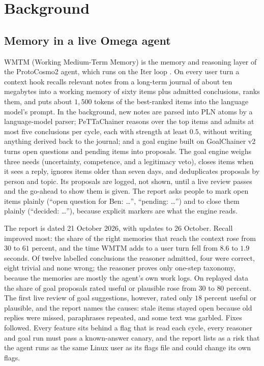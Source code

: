 \documentclass[11pt]{article}
\theoremstyle{definition}
\theoremstyle{plain}
\begin{document}
\section{Background}\label{sec:background}

\subsection{Memory in a live Omega agent}\label{sec:wmtm}

WMTM (Working Medium-Term Memory) is the memory and reasoning layer of the ProtoCosmo2 agent, which runs on the Iter loop \cite{wmtm}. On every user turn a context hook recalls relevant
notes from a long-term journal of about ten megabytes into a working memory of sixty items plus
admitted conclusions, ranks them, and puts about $1{,}500$ tokens of the best-ranked items into the
language model's prompt. In the background, new notes are parsed into PLN atoms by a language-model
parser; PeTTaChainer reasons over the top items and admits at most five conclusions per cycle, each
with strength at least $0.5$, without writing anything derived back to the journal; and a goal
engine built on GoalChainer v2 turns open questions and pending items into proposals. The goal
engine weighs three needs (uncertainty, competence, and a legitimacy veto), closes items when it
sees a reply, ignores items older than seven days, and deduplicates proposals by person and topic.
Its proposals are logged, not shown, until a live review passes and the go-ahead to show them is
given. The report asks people to mark open items plainly (``open question for Ben: \ldots'',
``pending: \ldots'') and to close them plainly (``decided: \ldots''), because explicit markers are
what the engine reads.

The report is dated 21 October 2026, with updates to 26 October. Recall improved most: the share of the
right memories that reach the context rose from $30$ to $61$ percent, and the time WMTM adds to a
user turn fell from $8.6$ to $1.9$ seconds. Of twelve labelled conclusions the reasoner admitted,
four were correct, eight trivial and none wrong; the reasoner proves only one-step taxonomy,
because the memories are mostly the agent's own work logs. On replayed data the
share of goal proposals rated useful or plausible rose from $30$ to $80$ percent. The first live
review of goal suggestions, however, rated only $18$ percent useful or plausible, and the report
names the causes: stale items stayed open because old replies were missed, paraphrases repeated,
and some text was garbled. Fixes followed. Every feature sits behind a flag that is read each
cycle, every reasoner and goal run must pass a known-answer canary, and the report lists as a risk
that the agent runs as the same Linux user as its flags file and could change its own flags.
\end{document}
